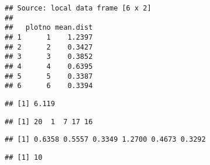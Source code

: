 \begin{verbatim}
## Source: local data frame [6 x 2]
## 
##   plotno mean.dist
## 1      1    1.2397
## 2      2    0.3427
## 3      3    0.3852
## 4      4    0.6395
## 5      5    0.3387
## 6      6    0.3394
\end{verbatim}

\begin{Shaded}
\begin{Highlighting}[]
\end{Highlighting}
\end{Shaded}

\begin{verbatim}
## [1] 6.119
\end{verbatim}

\begin{Shaded}
\begin{Highlighting}[]
\end{Highlighting}
\end{Shaded}

\begin{verbatim}
## [1] 20  1  7 17 16
\end{verbatim}

\begin{Shaded}
\begin{Highlighting}[]
\end{Highlighting}
\end{Shaded}

\begin{verbatim}
## [1] 0.6358 0.5557 0.3349 1.2700 0.4673 0.3292
\end{verbatim}

\begin{Shaded}
\begin{Highlighting}[]
\end{Highlighting}
\end{Shaded}

\begin{verbatim}
## [1] 10
\end{verbatim}

\begin{Shaded}
\begin{Highlighting}[]
\StringTok{ } \NormalTok{(}\NormalTok{, }\NormalTok{),}\NormalTok{, }\NormalTok{(}\NormalTok{), } \\
 \NormalTok{, } \NormalTok{, } \NormalTok{(}  \NormalTok{, } \NormalTok{)) }
\end{Highlighting}
\end{Shaded}

